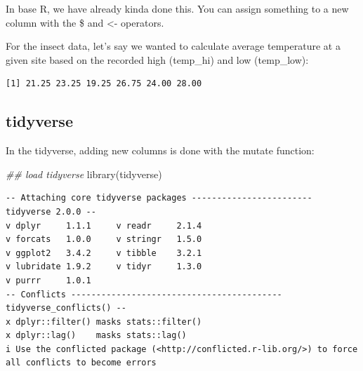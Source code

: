 \documentclass[
  letterpaper,
  DIV=11,
  numbers=noendperiod]{scrreprt}
\newenvironment{Shaded}{\begin{snugshade}}{\end{snugshade}}
\newcommand{\DecValTok}[1]{\textcolor[rgb]{0.68,0.00,0.00}{#1}}
\newcommand{\DocumentationTok}[1]{\textcolor[rgb]{0.37,0.37,0.37}{\textit{#1}}}
\newcommand{\FunctionTok}[1]{\textcolor[rgb]{0.28,0.35,0.67}{#1}}
\newcommand{\NormalTok}[1]{\textcolor[rgb]{0.00,0.23,0.31}{#1}}
\newcommand{\OtherTok}[1]{\textcolor[rgb]{0.00,0.23,0.31}{#1}}
\newcommand{\SpecialCharTok}[1]{\textcolor[rgb]{0.37,0.37,0.37}{#1}}
\begin{document}
In base R, we have already kinda done this. You can assign something to
a new column with the \$ and \textless- operators.

For the insect data, let's say we wanted to calculate average
temperature at a given site based on the recorded high (temp\_hi) and
low (temp\_low):

\begin{Shaded}
\end{Shaded}

\begin{verbatim}
[1] 21.25 23.25 19.25 26.75 24.00 28.00
\end{verbatim}

\hypertarget{tidyverse}{%
\subsection{tidyverse}\label{tidyverse}}

In the tidyverse, adding new columns is done with the mutate function:

\begin{Shaded}
\begin{Highlighting}[]
\DocumentationTok{\#\# load tidyverse}
\FunctionTok{library}\NormalTok{(tidyverse)}
\end{Highlighting}
\end{Shaded}

\begin{verbatim}
-- Attaching core tidyverse packages ------------------------ tidyverse 2.0.0 --
v dplyr     1.1.1     v readr     2.1.4
v forcats   1.0.0     v stringr   1.5.0
v ggplot2   3.4.2     v tibble    3.2.1
v lubridate 1.9.2     v tidyr     1.3.0
v purrr     1.0.1     
-- Conflicts ------------------------------------------ tidyverse_conflicts() --
x dplyr::filter() masks stats::filter()
x dplyr::lag()    masks stats::lag()
i Use the conflicted package (<http://conflicted.r-lib.org/>) to force all conflicts to become errors
\end{verbatim}
\end{document}
